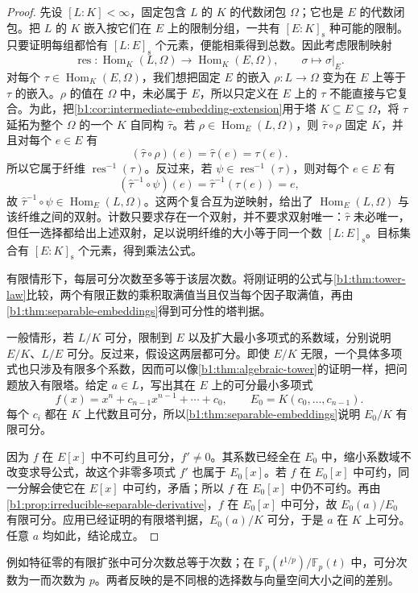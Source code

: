 \begin{proof}
	先设 \([L:K]<\infty\)，固定包含 \(L\) 的 \(K\) 的代数闭包 \(\Omega\)；它也是 \(E\) 的代数闭包。把 \(L\) 的 \(K\) 嵌入按它们在 \(E\) 上的限制分组，一共有 \([E:K]_{\mathrm s}\) 种可能的限制。只要证明每组都恰有 \([L:E]_{\mathrm s}\) 个元素，便能相乘得到总数。因此考虑限制映射
	\[
		\operatorname{res}:\operatorname{Hom}_K(L,\Omega) \longrightarrow\operatorname{Hom}_K(E,\Omega), \qquad \sigma\longmapsto\sigma|_E.
	\]
	对每个 \(\tau\in\operatorname{Hom}_K(E,\Omega)\)，我们想把固定 \(E\) 的嵌入 \(\rho:L\rightarrow\Omega\) 变为在 \(E\) 上等于 \(\tau\) 的嵌入。\(\rho\) 的值在 \(\Omega\) 中，未必属于 \(E\)，所以只定义在 \(E\) 上的 \(\tau\) 不能直接与它复合。为此，把\cref{b1:cor:intermediate-embedding-extension}用于塔 \(K\subseteq E\subseteq\Omega\)，将 \(\tau\) 延拓为整个 \(\Omega\) 的一个 \(K\) 自同构 \(\widehat\tau\)。若 \(\rho\in\operatorname{Hom}_E(L,\Omega)\)，则 \(\widehat\tau\circ\rho\) 固定 \(K\)，并且对每个 \(e\in E\) 有
	\[
		(\widehat\tau\circ\rho)(e)=\widehat\tau(e)=\tau(e).
	\]
	所以它属于纤维 \(\operatorname{res}^{-1}(\tau)\)。反过来，若 \(\psi\in\operatorname{res}^{-1}(\tau)\)，则对每个 \(e\in E\) 有
	\[
		(\widehat\tau^{-1}\circ\psi)(e) =\widehat\tau^{-1}(\tau(e))=e,
	\]
	故 \(\widehat\tau^{-1}\circ\psi\in\operatorname{Hom}_E(L,\Omega)\)。这两个复合互为逆映射，给出了 \(\operatorname{Hom}_E(L,\Omega)\) 与该纤维之间的双射。计数只要求存在一个双射，并不要求双射唯一：\(\widehat\tau\) 未必唯一，但任一选择都给出上述双射，足以说明纤维的大小等于同一个数 \([L:E]_{\mathrm s}\)。目标集合有 \([E:K]_{\mathrm s}\) 个元素，得到乘法公式。

	有限情形下，每层可分次数至多等于该层次数。将刚证明的公式与\cref{b1:thm:tower-law}比较，两个有限正数的乘积取满值当且仅当每个因子取满值，再由\cref{b1:thm:separable-embeddings}得到可分性的塔判据。

	一般情形，若 \(L/K\) 可分，限制到 \(E\) 以及扩大最小多项式的系数域，分别说明 \(E/K\)、\(L/E\) 可分。反过来，假设这两层都可分。即使 \(E/K\) 无限，一个具体多项式也只涉及有限多个系数，因而可以像\cref{b1:thm:algebraic-tower}的证明一样，把问题放入有限塔。给定 \(a\in L\)，写出其在 \(E\) 上的可分最小多项式
	\[
		f(x)=x^n+c_{n-1}x^{n-1}+\cdots+c_0, \qquad E_0=K(c_0,\ldots,c_{n-1}).
	\]
	每个 \(c_i\) 都在 \(K\) 上代数且可分，所以\cref{b1:thm:separable-embeddings}说明 \(E_0/K\) 有限可分。

	因为 \(f\) 在 \(E[x]\) 中不可约且可分，\(f'\neq0\)。其系数已经全在 \(E_0\) 中，缩小系数域不改变求导公式，故这个非零多项式 \(f'\) 也属于 \(E_0[x]\)。若 \(f\) 在 \(E_0[x]\) 中可约，同一分解会使它在 \(E[x]\) 中可约，矛盾；所以 \(f\) 在 \(E_0[x]\) 中仍不可约。再由\cref{b1:prop:irreducible-separable-derivative}，\(f\) 在 \(E_0[x]\) 中可分，故 \(E_0(a)/E_0\) 有限可分。应用已经证明的有限塔判据，\(E_0(a)/K\) 可分，于是 \(a\) 在 \(K\) 上可分。任意 \(a\) 均如此，结论成立。
\end{proof}
例如特征零的有限扩张中可分次数总等于次数；在 \(\mathbb F_p(t^{1/p})/\mathbb F_p(t)\) 中，可分次数为一而次数为 \(p\)。两者反映的是不同根的选择数与向量空间大小之间的差别。

